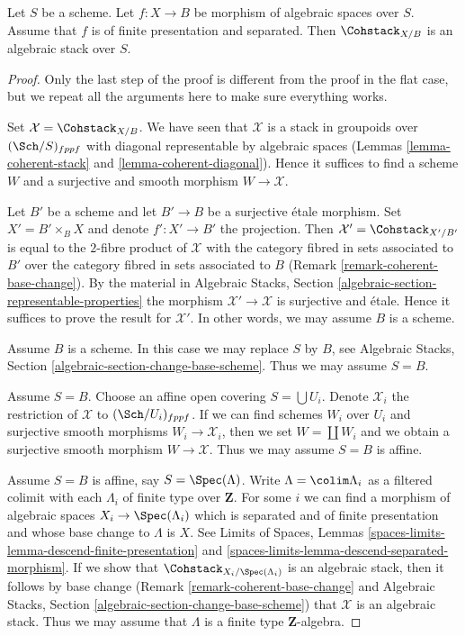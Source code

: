 \begin{theorem}
\label{theorem-coherent-algebraic-general}
Let $S$ be a scheme. Let $f : X \to B$ be morphism of algebraic spaces
over $S$. Assume that $f$ is of finite presentation and separated. Then
$\Cohstack_{X/B}$ is an algebraic stack over $S$.
\end{theorem}

\begin{proof}
Only the last step of the proof is different from the proof
in the flat case, but we repeat all the arguments here to make 
sure everything works.

\medskip\noindent
Set $\mathcal{X} = \Cohstack_{X/B}$. We have seen that $\mathcal{X}$
is a stack in groupoids over $(\Sch/S)_{fppf}$ with diagonal representable
by algebraic spaces
(Lemmas \ref{lemma-coherent-stack} and \ref{lemma-coherent-diagonal}).
Hence it suffices to find a scheme $W$ and a surjective and smooth
morphism $W \to \mathcal{X}$.

\medskip\noindent
Let $B'$ be a scheme and let $B' \to B$ be a surjective \'etale morphism.
Set $X' = B' \times_B X$ and denote $f' : X' \to B'$ the projection.
Then $\mathcal{X}' = \Cohstack_{X'/B'}$ is equal to the $2$-fibre
product of $\mathcal{X}$ with the category fibred in sets
associated to $B'$ over the category fibred in sets associated to $B$
(Remark \ref{remark-coherent-base-change}). By the material in
Algebraic Stacks, Section \ref{algebraic-section-representable-properties}
the morphism $\mathcal{X}' \to \mathcal{X}$ is surjective and \'etale.
Hence it suffices to prove the result for $\mathcal{X}'$.
In other words, we may assume $B$ is a scheme.

\medskip\noindent
Assume $B$ is a scheme. In this case we may replace $S$ by $B$, see
Algebraic Stacks, Section \ref{algebraic-section-change-base-scheme}.
Thus we may assume $S = B$.

\medskip\noindent
Assume $S = B$. Choose an affine open covering $S = \bigcup U_i$.
Denote $\mathcal{X}_i$ the restriction of $\mathcal{X}$ to
$(\Sch/U_i)_{fppf}$. If we can find schemes $W_i$ over $U_i$ and
surjective smooth morphisms $W_i \to \mathcal{X}_i$, then we
set $W = \coprod W_i$ and we obtain a surjective smooth morphism
$W \to \mathcal{X}$. Thus we may assume $S = B$ is affine.

\medskip\noindent
Assume $S = B$ is affine, say $S = \Spec(\Lambda)$.
Write $\Lambda = \colim \Lambda_i$ as a filtered colimit with each $\Lambda_i$
of finite type over $\mathbf{Z}$. For some $i$ we can find
a morphism of algebraic spaces $X_i \to \Spec(\Lambda_i)$
which is separated and of finite presentation and whose base change
to $\Lambda$ is $X$. See Limits of Spaces, Lemmas
\ref{spaces-limits-lemma-descend-finite-presentation} and
\ref{spaces-limits-lemma-descend-separated-morphism}.
If we show that $\Cohstack_{X_i/\Spec(\Lambda_i)}$ is an
algebraic stack, then it follows by base change
(Remark \ref{remark-coherent-base-change} and
Algebraic Stacks, Section \ref{algebraic-section-change-base-scheme})
that $\mathcal{X}$ is an algebraic stack.
Thus we may assume that $\Lambda$ is a finite type $\mathbf{Z}$-algebra.


\end{proof}
